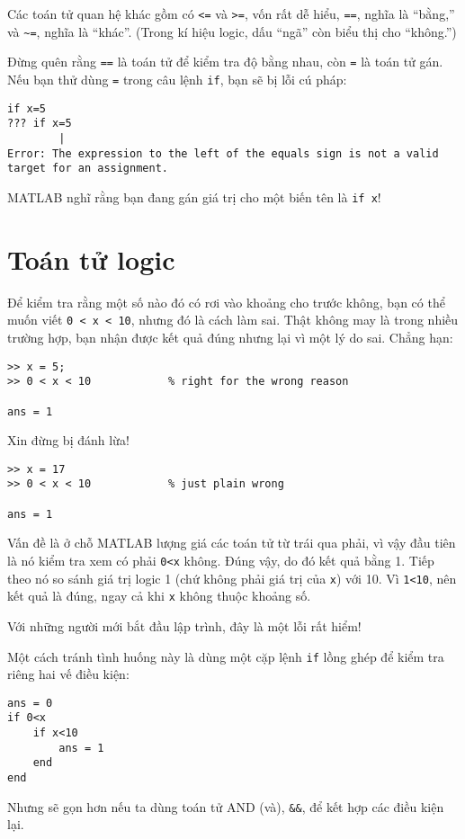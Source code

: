 \documentclass[12pt]{book}
\begin{document}
Các toán tử quan hệ khác gồm có {\tt <=} và {\tt >=}, vốn
rất dễ hiểu, {\tt ==}, nghĩa là ``bằng,'' và
\verb+~=+, nghĩa là ``khác''.  (Trong kí hiệu logic, dấu ``ngã''
còn biểu thị cho ``không.'')

Đừng quên rằng {\tt ==} là toán tử để kiểm tra độ bằng nhau, còn
{\tt =} là toán tử gán. Nếu bạn thử dùng {\tt =} trong
câu lệnh {\tt if}, bạn sẽ bị lỗi cú pháp:

\begin{verbatim}
if x=5
??? if x=5
        |
Error: The expression to the left of the equals sign is not a valid 
target for an assignment.
\end{verbatim}
%
MATLAB nghĩ rằng bạn đang gán giá trị cho một biến tên là {\tt if x}! 


\section{Toán tử logic}
\label{logop}

Để kiểm tra rằng một số nào đó có rơi vào khoảng cho trước không,
bạn có thể muốn viết {\tt 0 < x < 10}, nhưng đó là cách làm sai.
Thật không may là trong nhiều trường hợp, bạn nhận được
kết quả đúng nhưng lại vì một lý do sai. Chẳng hạn:

\begin{verbatim}
>> x = 5;
>> 0 < x < 10            % right for the wrong reason

ans = 1
\end{verbatim}

Xin đừng bị đánh lừa!

\begin{verbatim}
>> x = 17
>> 0 < x < 10            % just plain wrong

ans = 1
\end{verbatim}
%
Vấn đề là ở chỗ MATLAB lượng giá các toán tử từ trái qua phải,
vì vậy đầu tiên là nó kiểm tra xem có phải {\tt 0<x} không. 
Đúng vậy, do đó kết quả bằng 1. Tiếp theo nó so sánh giá trị
logic 1 (chứ không phải giá trị của {\tt x}) với 10.  
Vì {\tt 1<10}, nên kết quả là đúng, ngay cả khi {\tt x}
không thuộc khoảng số.

Với những người mới bắt đầu lập trình, đây là một lỗi rất hiểm!

Một cách tránh tình huống này là dùng một cặp lệnh {\tt if} 
lồng ghép để kiểm tra riêng hai vế điều kiện:

\begin{verbatim}
ans = 0
if 0<x
    if x<10
        ans = 1
    end
end
\end{verbatim}
%
Nhưng sẽ gọn hơn nếu ta dùng toán tử AND (và), {\tt \&\&}, 
để kết hợp các điều kiện lại.
\end{document}
